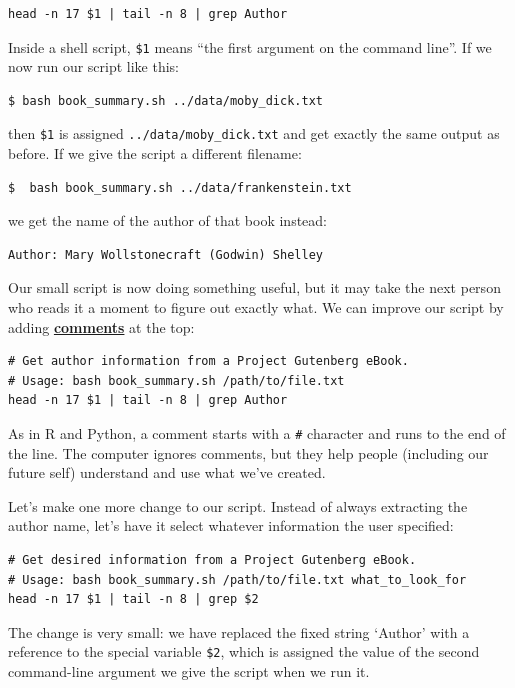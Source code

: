 \documentclass[
]{krantz}
\newcommand{\gref}[2]{\hyperlink{#2}{\textbf{#1}}}
\begin{document}
\begin{verbatim}
head -n 17 $1 | tail -n 8 | grep Author
\end{verbatim}

Inside a shell script,
\texttt{\$1} means ``the first argument on the command line''.
If we now run our script like this:

\begin{verbatim}
$ bash book_summary.sh ../data/moby_dick.txt
\end{verbatim}

then \texttt{\$1} is assigned \texttt{../data/moby\_dick.txt}
and get exactly the same output as before.
If we give the script a different filename:

\begin{verbatim}
$  bash book_summary.sh ../data/frankenstein.txt
\end{verbatim}

we get the name of the author of that book instead:

\begin{verbatim}
Author: Mary Wollstonecraft (Godwin) Shelley
\end{verbatim}

Our small script is now doing something useful,
but it may take the next person who reads it a moment to figure out exactly what.
We can improve our script by adding \gref{comments}{comment} at the top:

\begin{verbatim}
# Get author information from a Project Gutenberg eBook.
# Usage: bash book_summary.sh /path/to/file.txt
head -n 17 $1 | tail -n 8 | grep Author
\end{verbatim}

As in R and Python,
a comment starts with a \texttt{\#} character and runs to the end of the line.
The computer ignores comments,
but they help people (including our future self) understand and use what we've created.

Let's make one more change to our script.
Instead of always extracting the author name,
let's have it select whatever information the user specified:

\begin{verbatim}
# Get desired information from a Project Gutenberg eBook.
# Usage: bash book_summary.sh /path/to/file.txt what_to_look_for
head -n 17 $1 | tail -n 8 | grep $2
\end{verbatim}

The change is very small:
we have replaced the fixed string `Author' with a reference to the special variable \texttt{\$2},
which is assigned the value of the second command-line argument we give the script when we run it.
\end{document}
